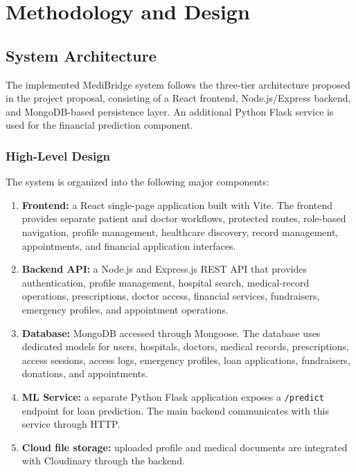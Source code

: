 \documentclass{tietreport}
\begin{document}
\chapter{Methodology and Design}

\section{System Architecture}

The implemented MediBridge system follows the three-tier architecture
proposed in the project proposal, consisting of a React frontend,
Node.js/Express backend, and MongoDB-based persistence layer. An
additional Python Flask service is used for the financial prediction
component.

\subsection{High-Level Design}

The system is organized into the following major components:

\begin{enumerate}
  \item \textbf{Frontend:} a React single-page application built with
    Vite. The frontend provides separate patient and doctor workflows,
    protected routes, role-based navigation, profile management,
    healthcare discovery, record management, appointments, and financial
    application interfaces.

  \item \textbf{Backend API:} a Node.js and Express.js REST API that
    provides authentication, profile management, hospital search,
    medical-record operations, prescriptions, doctor access, financial
    services, fundraisers, emergency profiles, and appointment
    operations.

  \item \textbf{Database:} MongoDB accessed through Mongoose. The
    database uses dedicated models for users, hospitals, doctors,
    medical records, prescriptions, access sessions, access logs,
    emergency profiles, loan applications, fundraisers, donations, and
    appointments.

  \item \textbf{ML Service:} a separate Python Flask application
    exposes a \texttt{/predict} endpoint for loan prediction. The main
    backend communicates with this service through HTTP.

  \item \textbf{Cloud file storage:} uploaded profile and medical
    documents are integrated with Cloudinary through the backend.
\end{enumerate}
\end{document}
